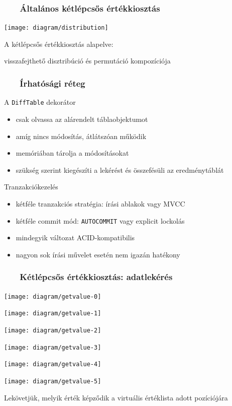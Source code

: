 \documentclass[
    aspectratio=169,
]{beamer}
\newcommand{\slidetitle}[2]{\frametitle{{\small #1 ~ \ding{226} ~ } \normalsize \textbf{#2} }}
\begin{document}
\begin{frame}
    \slidetitle{\sectionshorttitle}{Általános kétlépcsős értékkiosztás}
    
    \centering
    
    \texttt{[image: diagram/distribution]}
    
    A kétlépcsős értékkiosztás alapelve: \par
    visszafejthető disztribúció és permutáció kompozíciója
\end{frame}

\begin{frame}
    \slidetitle{\sectionshorttitle}{Írhatósági réteg}
    
    {\color{beamer@blendedblue}A \texttt{DiffTable} dekorátor}
    
    \begin{itemize}
        \item csak olvassa az alárendelt táblaobjektumot
        \item amíg nincs módosítás, átlátszóan működik
        \item memóriában tárolja a módosításokat
        \item szükség szerint kiegészíti a lekérést és összefésüli az eredménytáblát
    \end{itemize}
    
    \vspace{0.4cm}
    
    {\color{beamer@blendedblue}Tranzakciókezelés}
    
    \begin{itemize}
        \item kétféle tranzakciós stratégia: írási ablakok vagy MVCC
        \item kétféle commit mód: \texttt{AUTOCOMMIT} vagy explicit lockolás
        \item mindegyik változat ACID-kompatibilis
        \item nagyon sok írási művelet esetén nem igazán hatékony
    \end{itemize}
\end{frame}

\begin{frame}
    \slidetitle{\sectionshorttitle}{Kétlépcsős értékkiosztás: adatlekérés}
    
    \centering
    
    \begin{overprint}
        \centerline{\texttt{[image: diagram/getvalue-0]}}
        \centerline{\texttt{[image: diagram/getvalue-1]}}
        \centerline{\texttt{[image: diagram/getvalue-2]}}
        \centerline{\texttt{[image: diagram/getvalue-3]}}
        \centerline{\texttt{[image: diagram/getvalue-4]}}
        \centerline{\texttt{[image: diagram/getvalue-5]}}
    \end{overprint}
    
    \hspace{0.7cm}
    
    Lekövetjük, melyik érték képződik a virtuális értéklista adott pozíciójára
\end{frame}
\end{document}
